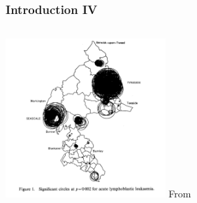 \documentclass{beamer}
\begin{document}
\begin{frame}[t]
\frametitle{Introduction IV}
\begin{columns}
    \includegraphics[height=6.0cm]{first_gam.png}
    From \citet{citeulike:5207314}
\end{columns}
\end{frame}
\end{document}
